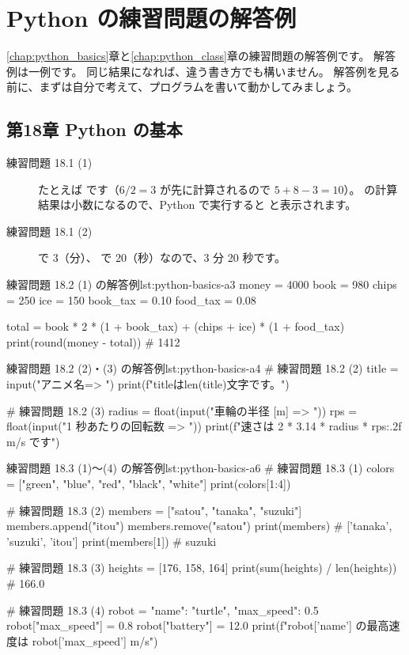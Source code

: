 \chapter{Python の練習問題の解答例}
\label{app:python-answers}

\ref{chap:python_basics}章と\ref{chap:python_class}章の練習問題の解答例です。
解答例は一例です。
同じ結果になれば、違う書き方でも構いません。
解答例を見る前に、まずは自分で考えて、プログラムを書いて動かしてみましょう。

\section{第18章 Python の基本}
\label{sec:python-basics-answers}

\begin{description}
  \item[練習問題 18.1 (1)] たとえば  です（$6 / 2 = 3$ が先に計算されるので $5 + 8 - 3 = 10$）。\cmd{/} の計算結果は小数になるので、Python で実行すると  と表示されます。
  \item[練習問題 18.1 (2)]  で 3（分）、 で 20（秒）なので、3 分 20 秒です。
\end{description}

\begin{codelisting}[style=python]{練習問題 18.2 (1) の解答例}{lst:python-basics-a3}
money = 4000
book = 980
chips = 250
ice = 150
book_tax = 0.10
food_tax = 0.08

total = book * 2 * (1 + book_tax) + (chips + ice) * (1 + food_tax)
print(round(money - total))   # 1412
\end{codelisting}

\begin{codelisting}[style=python]{練習問題 18.2 (2)・(3) の解答例}{lst:python-basics-a4}
# 練習問題 18.2 (2)
title = input("アニメ名=> ")
print(f"{title}は{len(title)}文字です。")

# 練習問題 18.2 (3)
radius = float(input("車輪の半径 [m] => "))
rps = float(input("1 秒あたりの回転数 => "))
print(f"速さは {2 * 3.14 * radius * rps:.2f} m/s です")
\end{codelisting}

\begin{codelisting}[style=python]{練習問題 18.3 (1)〜(4) の解答例}{lst:python-basics-a6}
# 練習問題 18.3 (1)
colors = ["green", "blue", "red", "black", "white"]
print(colors[1:4])

# 練習問題 18.3 (2)
members = ["satou", "tanaka", "suzuki"]
members.append("itou")
members.remove("satou")
print(members)       # ['tanaka', 'suzuki', 'itou']
print(members[1])    # suzuki

# 練習問題 18.3 (3)
heights = [176, 158, 164]
print(sum(heights) / len(heights))   # 166.0

# 練習問題 18.3 (4)
robot = {"name": "turtle", "max_speed": 0.5}
robot["max_speed"] = 0.8
robot["battery"] = 12.0
print(f"{robot['name']} の最高速度は {robot['max_speed']} m/s")
\end{codelisting}

